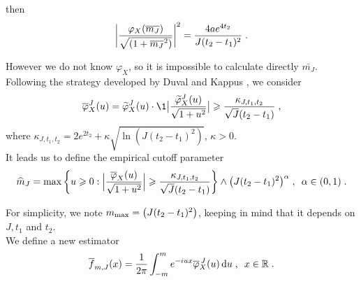 then
    \begin{equation*}
       \bigg|\frac{\varphi_X(\overline{m_J})}{\sqrt{(1 + \overline{m_J}^{2})}}  \bigg|^2 = \frac{4a e^{4t_2}}{J (t_2 - t_1)^2}
        \; .
    \end{equation*}

However we do not know $\varphi_X$, so it is impossible to calculate directly $\bar{m_J}$.
Following the strategy developed by Duval and Kappus \cite{duval2019adaptive}, we consider
    \begin{equation*}
    \bar \varphi_X^J(u) = \tilde \varphi_X^J(u) \cdot \1{ \big|\frac{\tilde \varphi_X^J(u)}{\sqrt{1 + u^2}}  \big| \geq \frac{\kappa_{J, t_1, t_2}}{\sqrt{J}(t_2 - t_1)}}
    \eqfinv
    \end{equation*}
where $\kappa_{J, t_1, t_2} = 2 e^{2 t_2} + \kappa \sqrt{\ln(J ( t_2 - t_1)^2)}$, $\kappa > 0$. \\

It leads us to define the empirical cutoff parameter
    \begin{equation*}
        \widehat m_J = \max \bigg\{ u \geqslant 0: \Big|\frac{\overline \varphi_X(u)}{\sqrt{1 + u^2}}  \Big| \geqslant \frac{\kappa_{J, t_1, t_2}}{\sqrt{J}(t_2 - t_1)}\bigg\} \wedge \big(J(t_2 - t_1)^2 \big)^\alpha
        \; , \enspace
        \alpha \in (0, 1)
        \; .
    \end{equation*}

For simplicity, we note $m_{\max} = \big(J(t_2 - t_1)^2 \big)$, keeping in mind that it depends on $J, t_1$ and $t_2$. \\

We define a new estimator 
	\begin{equation*}
        \overline f_{m, J}(x) = \frac{1}{2\pi} \int_{-m}^m e^{-iux} \overline \varphi_X^{\, J} (u) \, \mathrm du
        \; , \enspace
        x \in \mathbb{R}
        \; .
    \end{equation*}
    
